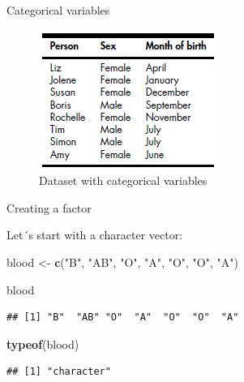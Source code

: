 \documentclass[ignorenonframetext,]{beamer}
\newenvironment{Shaded}{\begin{snugshade}}{\end{snugshade}}
\newcommand{\KeywordTok}[1]{\textcolor[rgb]{0.13,0.29,0.53}{\textbf{#1}}}
\newcommand{\NormalTok}[1]{#1}
\newcommand{\StringTok}[1]{\textcolor[rgb]{0.31,0.60,0.02}{#1}}
\begin{document}
\begin{frame}{Categorical variables}
\protect\hypertarget{categorical-variables-2}{}

\begin{figure}
\centering
\includegraphics{dataset.png}
\caption{Dataset with categorical variables}
\end{figure}

\end{frame}

\begin{frame}[fragile]{Creating a factor}
\protect\hypertarget{creating-a-factor}{}

Let´s start with a character vector:

\begin{Shaded}
\begin{Highlighting}[]
\NormalTok{blood <-}\StringTok{ }\KeywordTok{c}\NormalTok{(}\StringTok{"B"}\NormalTok{, }\StringTok{"AB"}\NormalTok{, }\StringTok{"O"}\NormalTok{, }\StringTok{"A"}\NormalTok{, }\StringTok{"O"}\NormalTok{, }\StringTok{"O"}\NormalTok{, }\StringTok{"A"}\NormalTok{) }

\NormalTok{blood}
\end{Highlighting}
\end{Shaded}

\begin{verbatim}
## [1] "B"  "AB" "O"  "A"  "O"  "O"  "A"
\end{verbatim}

\begin{Shaded}
\begin{Highlighting}[]
\KeywordTok{typeof}\NormalTok{(blood)}
\end{Highlighting}
\end{Shaded}

\begin{verbatim}
## [1] "character"
\end{verbatim}

\end{frame}
\end{document}

